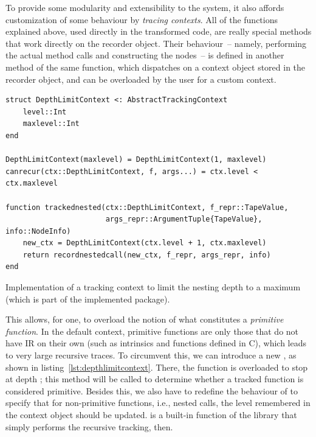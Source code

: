 To provide some modularity and extensibility to the system, it also affords customization of some
behaviour by \emph{tracing contexts}.  All of the  functions explained above, used
directly in the transformed code, are really special methods that work directly on the recorder
object.  Their behaviour~-- namely, performing the actual method calls and constructing the nodes~--
is defined in another method of the same function, which dispatches on a context object stored in
the recorder object, and can be overloaded by the user for a custom context.  

\begin{lstfloat}
\begin{lstlisting}[style=lstfloat]
struct DepthLimitContext <: AbstractTrackingContext
    level::Int
    maxlevel::Int
end

DepthLimitContext(maxlevel) = DepthLimitContext(1, maxlevel)
canrecur(ctx::DepthLimitContext, f, args...) = ctx.level < ctx.maxlevel

function trackednested(ctx::DepthLimitContext, f_repr::TapeValue,
                       args_repr::ArgumentTuple{TapeValue}, info::NodeInfo)
    new_ctx = DepthLimitContext(ctx.level + 1, ctx.maxlevel)
    return recordnestedcall(new_ctx, f_repr, args_repr, info)
end
\end{lstlisting}
  \caption{Implementation of a tracking context to limit the nesting depth to a maximum (which is
    part of the implemented package).\label{lst:depthlimitcontext}}
\end{lstfloat}

This allows, for one, to overload the notion of what constitutes a \emph{primitive function}.  In
the default context, primitive functions are only those that do not have IR on their own (such as
intrinsics and functions defined in C), which leads to very large recursive traces.  To circumvent
this, we can introduce a new , as shown in
listing~\ref{lst:depthlimitcontext}.  There, the function  is overloaded to stop at
depth ; this method will be called to determine whether a tracked function is
considered primitive.  Besides this, we also have to redefine the behaviour of 
to specify that for non-primitive functions, i.e., nested calls, the level remembered in the context
object should be updated.   is a built-in function of the library that
simply performs the recursive tracking, then.

